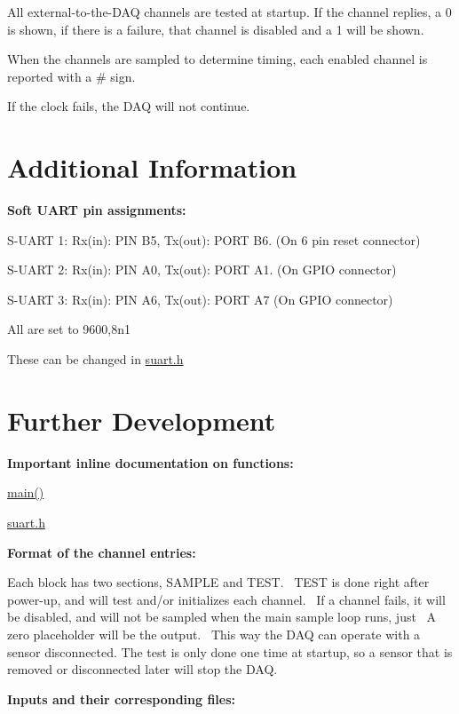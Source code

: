 All external-\/to-\/the-\/\-D\-A\-Q channels are tested at startup. If the channel replies, a 0 is shown, if there is a failure, that channel is disabled and a 1 will be shown.

When the channels are sampled to determine timing, each enabled channel is reported with a \# sign.

If the clock fails, the D\-A\-Q will not continue. \par
 \hypertarget{index_five}{}\section{Additional Information}\label{index_five}
{\bfseries Soft U\-A\-R\-T pin assignments\-:}\par
 S-\/\-U\-A\-R\-T 1\-: Rx(in)\-: P\-I\-N B5, Tx(out)\-: P\-O\-R\-T B6. (On 6 pin reset connector)\par
 S-\/\-U\-A\-R\-T 2\-: Rx(in)\-: P\-I\-N A0, Tx(out)\-: P\-O\-R\-T A1. (On G\-P\-I\-O connector)\par
 S-\/\-U\-A\-R\-T 3\-: Rx(in)\-: P\-I\-N A6, Tx(out)\-: P\-O\-R\-T A7 (On G\-P\-I\-O connector)\par
 All are set to 9600,8n1\par
 These can be changed in \hyperlink{suart_8h}{suart.\-h} \hypertarget{index_six}{}\section{Further Development}\label{index_six}
{\bfseries Important inline documentation on functions\-: \par
 } \hyperlink{main_8c_ae66f6b31b5ad750f1fe042a706a4e3d4}{main()}\par
 \hyperlink{suart_8h}{suart.\-h}\par
 {\bfseries Format of the channel entries\-: \par
 }Each block has two sections, S\-A\-M\-P\-L\-E and T\-E\-S\-T.~ T\-E\-S\-T is done right after power-\/up, and will test and/or initializes each channel.~ If a channel fails, it will be disabled, and will not be sampled when the main sample loop runs, just~ A zero placeholder will be the output.~ This way the D\-A\-Q can operate with a sensor disconnected. The test is only done one time at startup, so a sensor that is removed or disconnected later will stop the D\-A\-Q.~ \par
 \par
 {\bfseries Inputs and their corresponding files\-:}   